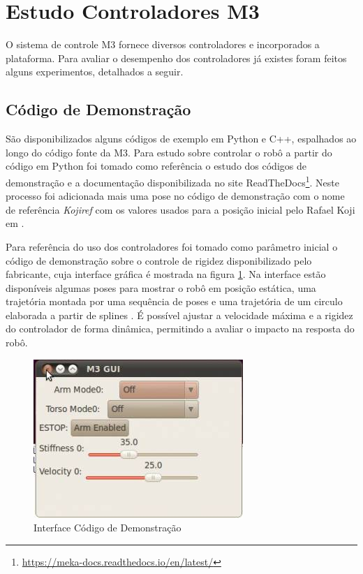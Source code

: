 \section{Estudo Controladores M3}

O sistema de controle M3 fornece diversos controladores e incorporados a plataforma. Para avaliar o desempenho dos controladores já existes foram feitos alguns experimentos, detalhados a seguir.

\subsection{Código de Demonstração}

São disponibilizados alguns códigos de exemplo em Python e C++, espalhados ao longo do código fonte da M3. Para estudo sobre controlar o robô a partir do código em Python foi tomado como referência o estudo dos códigos de demonstração e a documentação disponibilizada no site ReadTheDocs\footnote{\url{https://meka-docs.readthedocs.io/en/latest/}}. Neste processo foi adicionada mais uma pose no código de demonstração com o nome de referência \textit{Kojiref} com os valores usados para a posição inicial pelo Rafael Koji em \cite{koji2017}.

Para referência do uso dos controladores foi tomado como parâmetro inicial o código de demonstração sobre o controle de rigidez disponibilizado pelo fabricante, cuja interface gráfica é mostrada na figura \ref{fig:m3demo}. Na interface estão disponíveis algumas poses para mostrar o robô em posição estática, uma trajetória montada por uma sequência de poses e uma trajetória de um circulo elaborada a partir de splines \cite{nobody}. É possível ajustar a velocidade máxima e a rigidez do controlador de forma dinâmica, permitindo a avaliar o impacto na resposta do robô.

\begin{figure}[H]
    \centering
    \includegraphics[width=0.5\linewidth]{tex/figs/mekademo.png}
    \caption{Interface Código de Demonstração \cite{mekaguide}}
    \label{fig:m3demo}
\end{figure}

